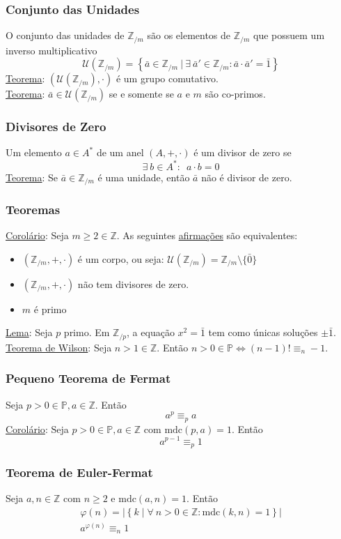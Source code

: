 \documentclass{article}
\begin{document}
\subsubsection{Conjunto das Unidades}
O conjunto das unidades de $\mathbb{Z}_{/m}$ são os elementos de $\mathbb{Z}_{/m}$ que possuem um inverso multiplicativo
\[ \mathcal{U}(\mathbb{Z}_{/m}) = \left\{ \bar{a} \in \mathbb{Z}_{/m} \>\big|\> \exists\: \bar{a}' \in \mathbb{Z}_{/m}: \bar{a} \cdot \bar{a}' = \bar{1} \right\} \]
\uline{Teorema}: $\left(\mathcal{U}(\mathbb{Z}_{/m}), \cdot \right)$ é um grupo comutativo. \\[10pt]
\uline{Teorema}: $\bar{a} \in \mathcal{U}(\mathbb{Z}_{/m})$ se e somente se $a$ e $m$ são co-primos.

\subsubsection{Divisores de Zero}
Um elemento $a \in A^*$ de um anel $(A, +, \cdot)$ é um divisor de zero se
\[ \exists\: b \in A^*: \enspace a \cdot b = 0 \]
\uline{Teorema}: Se $\bar{a} \in \mathbb{Z}_{/m}$ é uma unidade, então $\bar{a}$ não é divisor de zero.

\subsubsection{Teoremas}
\uline{Corolário}: Seja $m \geq 2 \in \mathbb{Z}$. As seguintes \uline{afirmações} são equivalentes:
\begin{itemize}
  \setlength\itemsep{0px}
  \item $(\mathbb{Z}_{/m}, +, \cdot)$ é um corpo, ou seja: $\mathcal{U}(\mathbb{Z}_{/m}) = \mathbb{Z}_{/m} \setminus \{\bar{0}\}$
  \item $(\mathbb{Z}_{/m}, +, \cdot)$ não tem divisores de zero.
  \item $m$ é primo
\end{itemize}
\uline{Lema}: Seja $p$ primo. Em $\mathbb{Z}_{/p}$, a equação $x^2 = \bar{1}$ tem como únicas soluções $\pm \bar{1}$. \\[10pt]
\uline{Teorema de Wilson}: Seja $n > 1 \in \mathbb{Z}$. Então $n > 0 \in \mathbb{P} \iff (n - 1)! \equiv_n -1$.

\subsubsection{Pequeno Teorema de Fermat}
Seja $p > 0 \in \mathbb{P}, a \in \mathbb{Z}$. Então
\[ a^p \equiv_p a \]
\uline{Corolário}: Seja $p > 0 \in \mathbb{P}, a \in \mathbb{Z}$ com $\text{mdc}(p,a) = 1$. Então
\[ a^{p-1} \equiv_p 1 \]

\subsubsection{Teorema de Euler-Fermat}
Seja $a, n \in \mathbb{Z}$ com $n \geq 2$ e $\text{mdc}(a,n) = 1$. Então
\begin{gather*}
  \varphi(n) = \big| \left\{ k \mid \forall\: n > 0 \in \mathbb{Z}: \text{mdc}(k,n) = 1 \right\} \big| \\[5pt]
  a^{\varphi(n)} \equiv_n 1
\end{gather*}
\end{document}
